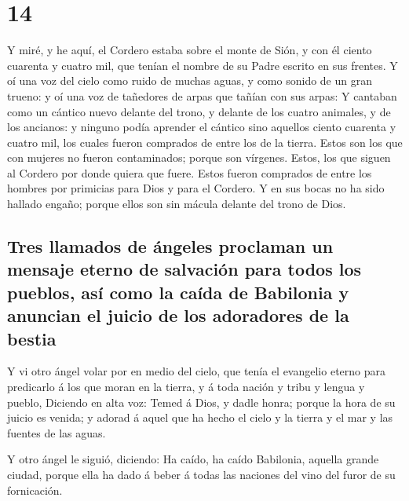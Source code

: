 \hypertarget{section-13}{%
\section{14}\label{section-13}}

 Y miré, y he aquí, el Cordero estaba sobre el monte de
Sión, y con él ciento cuarenta y cuatro mil, que tenían el nombre de su
Padre escrito en sus frentes.  Y oí una voz del cielo como
ruido de muchas aguas, y como sonido de un gran trueno: y oí una voz de
tañedores de arpas que tañían con sus arpas:  Y cantaban
como un cántico nuevo delante del trono, y delante de los cuatro
animales, y de los ancianos: y ninguno podía aprender el cántico sino
aquellos ciento cuarenta y cuatro mil, los cuales fueron comprados de
entre los de la tierra.  Estos son los que con mujeres no
fueron contaminados; porque son vírgenes. Estos, los que siguen al
Cordero por donde quiera que fuere. Estos fueron comprados de entre los
hombres por primicias para Dios y para el Cordero.  Y en sus
bocas no ha sido hallado engaño; porque ellos son sin mácula delante del
trono de Dios.

\hypertarget{tres-llamados-de-uxe1ngeles-proclaman-un-mensaje-eterno-de-salvaciuxf3n-para-todos-los-pueblos-asuxed-como-la-cauxedda-de-babilonia-y-anuncian-el-juicio-de-los-adoradores-de-la-bestia}{%
\subsection{Tres llamados de ángeles proclaman un mensaje eterno de
salvación para todos los pueblos, así como la caída de Babilonia y
anuncian el juicio de los adoradores de la
bestia}\label{tres-llamados-de-uxe1ngeles-proclaman-un-mensaje-eterno-de-salvaciuxf3n-para-todos-los-pueblos-asuxed-como-la-cauxedda-de-babilonia-y-anuncian-el-juicio-de-los-adoradores-de-la-bestia}}

 Y vi otro ángel volar por en medio del cielo, que tenía el
evangelio eterno para predicarlo á los que moran en la tierra, y á toda
nación y tribu y lengua y pueblo,  Diciendo en alta voz:
Temed á Dios, y dadle honra; porque la hora de su juicio es venida; y
adorad á aquel que ha hecho el cielo y la tierra y el mar y las fuentes
de las aguas.

 Y otro ángel le siguió, diciendo: Ha caído, ha caído
Babilonia, aquella grande ciudad, porque ella ha dado á beber á todas
las naciones del vino del furor de su fornicación.

